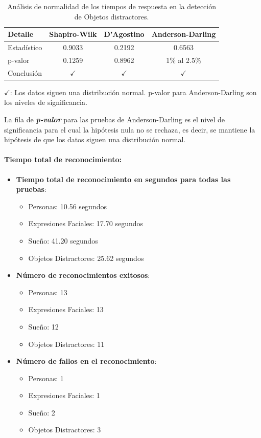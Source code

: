 \begin{table}[h]
\centering
\caption{Análisis de normalidad de los tiempos de respuesta en la detección de Objetos distractores.}
\label{ObjectNormality}
\begin{tabularx}{0.6\textwidth}{Xccc}
	\toprule
	\textbf{Detalle} & \textbf{Shapiro-Wilk} & \textbf{D'Agostino} & \textbf{Anderson-Darling}\\
	\midrule
	Estadístico & 0.9033 & 0.2192 & 0.6563 \\
	p-valor & 0.1259 & 0.8962 & 1\% al 2.5\% \\
	Conclusión & \(\checkmark\) & \(\checkmark\) & \(\checkmark\)\\
\end{tabularx}
\vspace{0.3em} %
\parbox{0.75\textwidth}{\footnotesize
	\(\checkmark\): Los datos siguen una distribución normal. p-valor para Anderson-Darling son los niveles de significancia.
}
\end{table}

La fila de \textbf{\textit{p-valor}} para las pruebas de Anderson-Darling es el nivel de significancia para el cual la hipótesis nula no se rechaza, es decir, se mantiene la hipótesis de que los datos siguen una distribución normal.

\paragraph{Tiempo total de reconocimiento: }
\begin{itemize}
\item \textbf{Tiempo total de reconocimiento en segundos para todas las pruebas}: 
\begin{itemize}
	\item Personas: 10.56 segundos
	\item Expresiones Faciales: 17.70 segundos
	\item Sueño: 41.20 segundos
	\item Objetos Distractores: 25.62 segundos
\end{itemize}
\item \textbf{Número de reconocimientos exitosos}:
\begin{itemize}
	\item Personas: 13
	\item Expresiones Faciales: 13
	\item Sueño: 12
	\item Objetos Distractores: 11
\end{itemize}
\item \textbf{Número de fallos en el reconocimiento}:
\begin{itemize}
	\item Personas: 1
	\item Expresiones Faciales: 1
	\item Sueño: 2
	\item Objetos Distractores: 3
\end{itemize}
\end{itemize}

